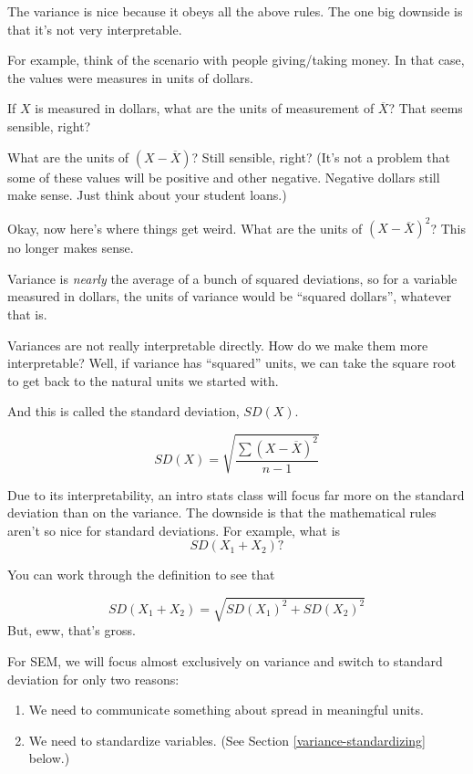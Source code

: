 \documentclass[
]{book}
\providecommand{\tightlist}{%
  \setlength{\itemsep}{0pt}\setlength{\parskip}{0pt}}
\begin{document}
The variance is nice because it obeys all the above rules. The one big downside is that it's not very interpretable.

For example, think of the scenario with people giving/taking money. In that case, the values were measures in units of dollars.

If \(X\) is measured in dollars, what are the units of measurement of \(\overline{X}\)? That seems sensible, right?

What are the units of \(\left(X - \overline{X}\right)\)? Still sensible, right? (It's not a problem that some of these values will be positive and other negative. Negative dollars still make sense. Just think about your student loans.)

Okay, now here's where things get weird. What are the units of \(\left(X - \overline{X}\right)^{2}\)? This no longer makes sense.

Variance is \emph{nearly} the average of a bunch of squared deviations, so for a variable measured in dollars, the units of variance would be ``squared dollars'', whatever that is.

Variances are not really interpretable directly. How do we make them more interpretable? Well, if variance has ``squared'' units, we can take the square root to get back to the natural units we started with.

And this is called the standard deviation, \(SD(X)\).

\[
SD(X) = \sqrt{\frac{\sum{\left(X - \overline{X}\right)^{2}}}
{n - 1}}
\]

Due to its interpretability, an intro stats class will focus far more on the standard deviation than on the variance. The downside is that the mathematical rules aren't so nice for standard deviations. For example, what is
\[
SD\left(X_{1} + X_{2}\right)?
\]

You can work through the definition to see that

\[
SD\left(X_{1} + X_{2}\right) = \sqrt{
SD\left(X_{1}\right)^{2} + SD\left(X_{2}\right)^{2}
}
\]
But, eww, that's gross.

For SEM, we will focus almost exclusively on variance and switch to standard deviation for only two reasons:

\begin{enumerate}
\def\labelenumi{\arabic{enumi}.}
\tightlist
\item
  We need to communicate something about spread in meaningful units.
\item
  We need to standardize variables. (See Section \ref{variance-standardizing} below.)
\end{enumerate}
\end{document}
